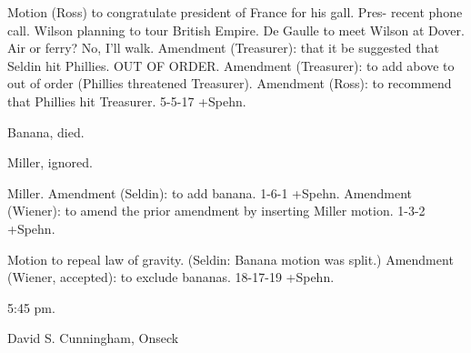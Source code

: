 \documentclass[12pt]{article}
\begin{document}
Motion (Ross) to congratulate president of France for his gall. Pres- recent phone call. Wilson planning to tour British Empire. De Gaulle to meet Wilson at Dover. Air or ferry? No, I'll walk. Amendment (Treasurer): that it be suggested that Seldin hit Phillies. OUT OF ORDER. Amendment (Treasurer): to add above to out of order (Phillies threatened Treasurer). Amendment (Ross): to recommend that Phillies hit Treasurer. 5-5-17 +Spehn.

Banana, died.

Miller, ignored.

Miller. Amendment (Seldin): to add banana. 1-6-1 +Spehn. Amendment (Wiener): to amend the prior amendment by inserting Miller motion. 1-3-2 +Spehn.

Motion to repeal law of gravity. (Seldin: Banana motion was split.) Amendment (Wiener, accepted): to exclude bananas. 18-17-19 +Spehn.

5:45 pm.

\vspace{12pt}

\centerline{David S. Cunningham, Onseck}
\end{document}
